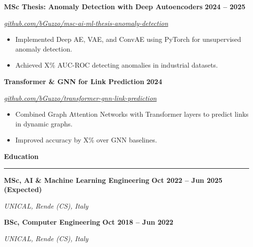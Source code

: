 \documentclass[9pt, a4paper]{article}
\newcommand{\cvsection}[1]{%
	\vspace{8pt}\par
	{\Large\bfseries\color{sectionblue}#1}\par
	\vspace{2pt}\hrule\vspace{6pt}
}
\newcommand{\cvsubsection}[3]{%
	\par {\large\bfseries #1} \hfill {\bfseries #2} \par {\textit{#3}} \vspace{4pt}
}
\begin{document}
\begin{minipage}[t]{0.70\linewidth}
		\cvsubsection{MSc Thesis: Anomaly Detection with Deep Autoencoders}{2024 -- 2025}{\href{https://github.com/bGuzzo/msc-ai-ml-thesis-anomaly-detection}{github.com/bGuzzo/msc-ai-ml-thesis-anomaly-detection}}
		\begin{itemize}[leftmargin=*, nosep]
			\item Implemented Deep AE, VAE, and ConvAE using PyTorch for unsupervised anomaly detection.
			\item Achieved X\% AUC-ROC detecting anomalies in industrial datasets.
		\end{itemize}
		
		\vspace{6pt}
		\cvsubsection{Transformer \& GNN for Link Prediction}{2024}{\href{https://github.com/bGuzzo/transformer-gnn-link-prediction}{github.com/bGuzzo/transformer-gnn-link-prediction}}
		\begin{itemize}[leftmargin=*, nosep]
			\item Combined Graph Attention Networks with Transformer layers to predict links in dynamic graphs.
			\item Improved accuracy by X\% over GNN baselines.
		\end{itemize}
		
		\cvsection{Education}
		
		\cvsubsection{MSc, AI \& Machine Learning Engineering}{Oct 2022 -- Jun 2025 (Expected)}{UNICAL, Rende (CS), Italy}
		\cvsubsection{BSc, Computer Engineering}{Oct 2018 -- Jun 2022}{UNICAL, Rende (CS), Italy}
		
	\end{minipage}%
	\hfill%
\end{document}
